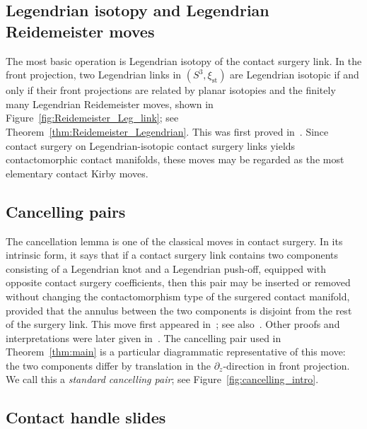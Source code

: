 \documentclass{amsart}
\numberwithin{equation}{section}
\numberwithin{figure}{section}
\theoremstyle{definition}
\theoremstyle{remark}
\let\olddxi\xi %
\renewcommand{\xi}{\olddxi}
\newcommand{\xist}{\olddxi_{\mathrm{st}}}
\begin{document}
\subsection{Legendrian isotopy and Legendrian Reidemeister moves}
The most basic operation is Legendrian isotopy of the contact surgery link. In the front projection, two Legendrian links in \((S^3,\xist)\) are Legendrian isotopic if and only if their front projections are related by planar isotopies and the finitely many Legendrian Reidemeister moves, shown in Figure~\ref{fig:Reidemeister_Leg_link}; see Theorem~\ref{thm:Reidemeister_Legendrian}. This was first proved in~\cite{Legendrian_Reidemeister}. Since contact surgery on Legendrian-isotopic contact surgery links yields contactomorphic contact manifolds, these moves may be regarded as the most elementary contact Kirby moves. 

\subsection{Cancelling pairs}
The cancellation lemma is one of the classical moves in contact surgery. In its intrinsic form, it says that if a contact surgery link contains two components consisting of a Legendrian knot and a Legendrian push-off, equipped with opposite contact surgery coefficients, then this pair may be inserted or removed without changing the contactomorphism type of the surgered contact manifold, provided that the annulus between the two components is disjoint from the rest of the surgery link. This move first appeared in~\cite{Ding_Geiges_fillable}; see also~\cite{Ding_Geiges_Stipsicz}. Other proofs and interpretations were later given in~\cite{Avdek13,Casals_Etnyre_Kegel}. The cancelling pair used in Theorem~\ref{thm:main} is a particular diagrammatic representative of this move: the two components differ by translation in the \(\partial_z\)-direction in front projection. We call this a \emph{standard cancelling pair}; see Figure~\ref{fig:cancelling_intro}.

\subsection{Contact handle slides}\label{sec:ctchadleslidegeneral}
\end{document}
